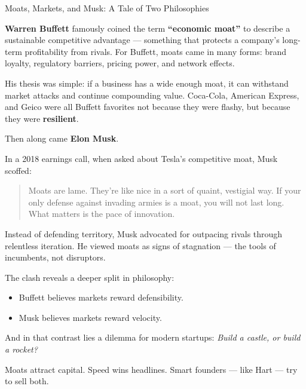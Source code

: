 \begin{HistoricalSidebar}{Moats, Markets, and Musk: A Tale of Two Philosophies}

  \textbf{Warren Buffett} famously coined the term \textbf{“economic moat”} to describe a sustainable competitive advantage — 
  something that protects a company’s long-term profitability from rivals. For Buffett, moats came in many forms: 
  brand loyalty, regulatory barriers, pricing power, and network effects.  
  
  \medskip
  
  His thesis was simple: if a business has a wide enough moat, it can withstand market attacks and continue compounding value. 
  Coca-Cola, American Express, and Geico were all Buffett favorites not because they were flashy, but because they were 
  \textbf{resilient}.  
  
  \medskip
  
  Then along came \textbf{Elon Musk}.  
  
  \medskip
  
  In a 2018 earnings call, when asked about Tesla’s competitive moat, Musk scoffed:
  
  \begin{quote}
  Moats are lame. They’re like nice in a sort of quaint, vestigial way. If your only defense against invading armies 
  is a moat, you will not last long. What matters is the pace of innovation.
  \end{quote}
  
  \medskip
  
  Instead of defending territory, Musk advocated for outpacing rivals through relentless iteration.  
  He viewed moats as signs of stagnation — the tools of incumbents, not disruptors.
  
  \medskip
  
  The clash reveals a deeper split in philosophy:  

  \medskip
  
  \begin{itemize}
    \item Buffett believes markets reward defensibility.
    \item Musk believes markets reward velocity.
  \end{itemize}
  
  \medskip
  
  And in that contrast lies a dilemma for modern startups:  
  \textit{Build a castle, or build a rocket?}  

  \medskip
  
  Moats attract capital. Speed wins headlines.  
  Smart founders — like Hart — try to sell both.
  
\end{HistoricalSidebar}

